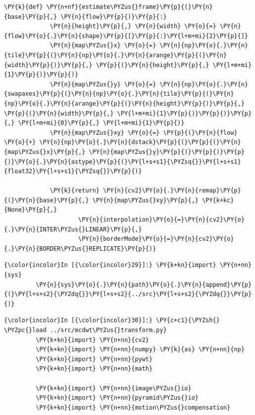 {\begin{Verbatim}[commandchars=\\\{\}]
         \PY{k}{def} \PY{n+nf}{estimate\PYZus{}frame}\PY{p}{(}\PY{n}{base}\PY{p}{,} \PY{n}{flow}\PY{p}{)}\PY{p}{:}
             \PY{n}{height}\PY{p}{,} \PY{n}{width} \PY{o}{=} \PY{n}{flow}\PY{o}{.}\PY{n}{shape}\PY{p}{[}\PY{p}{:}\PY{l+m+mi}{2}\PY{p}{]}
             \PY{n}{map\PYZus{}x} \PY{o}{=} \PY{n}{np}\PY{o}{.}\PY{n}{tile}\PY{p}{(}\PY{n}{np}\PY{o}{.}\PY{n}{arange}\PY{p}{(}\PY{n}{width}\PY{p}{)}\PY{p}{,} \PY{p}{(}\PY{n}{height}\PY{p}{,} \PY{l+m+mi}{1}\PY{p}{)}\PY{p}{)}
             \PY{n}{map\PYZus{}y} \PY{o}{=} \PY{n}{np}\PY{o}{.}\PY{n}{swapaxes}\PY{p}{(}\PY{n}{np}\PY{o}{.}\PY{n}{tile}\PY{p}{(}\PY{n}{np}\PY{o}{.}\PY{n}{arange}\PY{p}{(}\PY{n}{height}\PY{p}{)}\PY{p}{,} \PY{p}{(}\PY{n}{width}\PY{p}{,} \PY{l+m+mi}{1}\PY{p}{)}\PY{p}{)}\PY{p}{,} \PY{l+m+mi}{0}\PY{p}{,} \PY{l+m+mi}{1}\PY{p}{)}
             \PY{n}{map\PYZus{}xy} \PY{o}{=} \PY{p}{(}\PY{n}{flow} \PY{o}{+} \PY{n}{np}\PY{o}{.}\PY{n}{dstack}\PY{p}{(}\PY{p}{(}\PY{n}{map\PYZus{}x}\PY{p}{,} \PY{n}{map\PYZus{}y}\PY{p}{)}\PY{p}{)}\PY{p}{)}\PY{o}{.}\PY{n}{astype}\PY{p}{(}\PY{l+s+s1}{\PYZsq{}}\PY{l+s+s1}{float32}\PY{l+s+s1}{\PYZsq{}}\PY{p}{)}
         
             \PY{k}{return} \PY{n}{cv2}\PY{o}{.}\PY{n}{remap}\PY{p}{(}\PY{n}{base}\PY{p}{,} \PY{n}{map\PYZus{}xy}\PY{p}{,} \PY{k+kc}{None}\PY{p}{,} 
                     \PY{n}{interpolation}\PY{o}{=}\PY{n}{cv2}\PY{o}{.}\PY{n}{INTER\PYZus{}LINEAR}\PY{p}{,}
                     \PY{n}{borderMode}\PY{o}{=}\PY{n}{cv2}\PY{o}{.}\PY{n}{BORDER\PYZus{}REPLICATE}\PY{p}{)}
\end{Verbatim}


    \begin{Verbatim}[commandchars=\\\{\}]
{\color{incolor}In [{\color{incolor}29}]:} \PY{k+kn}{import} \PY{n+nn}{sys}
         \PY{n}{sys}\PY{o}{.}\PY{n}{path}\PY{o}{.}\PY{n}{append}\PY{p}{(}\PY{l+s+s2}{\PYZdq{}}\PY{l+s+s2}{../src}\PY{l+s+s2}{\PYZdq{}}\PY{p}{)}
\end{Verbatim}


    \begin{Verbatim}[commandchars=\\\{\}]
{\color{incolor}In [{\color{incolor}30}]:} \PY{c+c1}{\PYZsh{} \PYZpc{}load ../src/mcdwt\PYZus{}transform.py}
         \PY{k+kn}{import} \PY{n+nn}{cv2}
         \PY{k+kn}{import} \PY{n+nn}{numpy} \PY{k}{as} \PY{n+nn}{np}
         \PY{k+kn}{import} \PY{n+nn}{pywt}
         \PY{k+kn}{import} \PY{n+nn}{math}
         
         \PY{k+kn}{import} \PY{n+nn}{image\PYZus{}io}
         \PY{k+kn}{import} \PY{n+nn}{pyramid\PYZus{}io}
         \PY{k+kn}{import} \PY{n+nn}{motion\PYZus{}compensation}
         

\end{Verbatim}}

